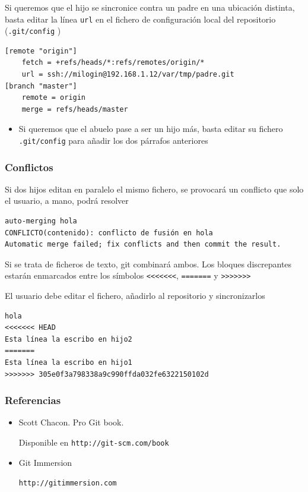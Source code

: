 \documentclass[ucs]{beamer}
\begin{document}
\begin{frame}[fragile]
\frametitle{}
Si queremos que el hijo se sincronice contra un padre en
una ubicación distinta, basta editar la línea
\verb|url| en el fichero de configuración local del repositorio
(\verb|.git/config| )

  \begin{scriptsize}
  \begin{verbatim}
[remote "origin"]
    fetch = +refs/heads/*:refs/remotes/origin/*
    url = ssh://milogin@192.168.1.12/var/tmp/padre.git
[branch "master"]
    remote = origin
    merge = refs/heads/master

  \end{verbatim}
  \end{scriptsize}
\begin{itemize}
\item
Si queremos que el abuelo pase a ser un hijo más, basta 
editar su fichero \verb|.git/config| para añadir
los dos párrafos anteriores
\end{itemize}

\end{frame}




\begin{frame}[fragile]
\frametitle{Conflictos}
Si dos hijos editan en paralelo el mismo fichero, se provocará
un conflicto que solo el usuario, a mano, podrá resolver


  \begin{scriptsize}
  \begin{verbatim}
auto-merging hola
CONFLICTO(contenido): conflicto de fusión en hola
Automatic merge failed; fix conflicts and then commit the result.
  \end{verbatim}
  \end{scriptsize}

Si se trata de ficheros de texto,
git combinará ambos.
Los bloques discrepantes
estarán enmarcados entre los símbolos \verb|<<<<<<<|,
\verb|=======| y \verb|>>>>>>>|

El usuario debe editar el fichero, añadirlo al repositorio
y sincronizarlos

  \begin{scriptsize}
  \begin{verbatim}
hola
<<<<<<< HEAD
Esta línea la escribo en hijo2
=======
Esta línea la escribo en hijo1
>>>>>>> 305e0f3a798338a9c990ffda032fe6322150102d

  \end{verbatim}
  \end{scriptsize}


\end{frame}

\begin{frame}[fragile]
\frametitle{Referencias}
\begin{itemize}
\item
Scott Chacon. Pro Git book. 

Disponible en \verb|http://git-scm.com/book|
\item
Git Immersion

\verb|http://gitimmersion.com|
\end{itemize}

\end{frame}
\end{document}
